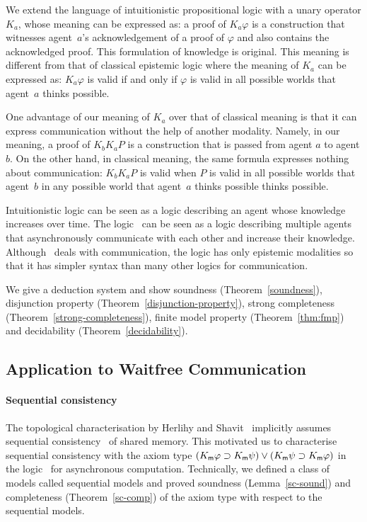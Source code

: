    We extend the language of intuitionistic propositional logic with a unary operator $K_a$,
    whose meaning can be expressed as:
    a proof of $K_a\varphi$ is a construction that witnesses agent~$a$'s
    acknowledgement of a proof of $\varphi$ and also contains the acknowledged
    proof.  This formulation of knowledge is original.
    This meaning is different from that of classical epistemic logic where
    the meaning of $K_a$ can be expressed as:
    $K_a\varphi$ is valid if and only if $\varphi$ is valid in all possible worlds
    that agent~$a$ thinks possible.

    One advantage of our meaning of $K_a$ over that of classical meaning is that
    it can express communication without the help of another modality.
    Namely, in our meaning,
    a proof of $K_bK_a P$ is a construction that is passed from agent $a$ to agent
    $b$.
    On the other hand, in classical meaning, the same formula expresses nothing about
    communication:
    $K_b K_a P$ is valid when $P$ is valid in all possible worlds that agent~$b$ in any
    possible world that agent~$a$ thinks possible thinks possible.

    Intuitionistic logic can be seen as a logic describing an agent whose knowledge increases over
    time.
    The logic \iec\,  can be seen as a logic describing multiple agents
    that asynchronously communicate with each other and increase their knowledge.
    Although \iec\, deals with communication, the logic has only epistemic modalities so that it
    has simpler syntax than many other logics for communication.

    We give a deduction system and show
    soundness (Theorem~\ref{soundness}), disjunction property (Theorem~\ref{disjunction-property}),
    strong completeness
    (Theorem~\ref{strong-completeness}), finite model property
    (Theorem~\ref{thm:fmp}) and decidability (Theorem~\ref{decidability}).

  \subsection{Application to Waitfree Communication}

    \paragraph{Sequential consistency}
    The topological characterisation by Herlihy and Shavit~\cite{herlihy1999topological}
    implicitly assumes sequential consistency~\cite{lamport1979make} of shared memory.
    This motivated us to characterise sequential consistency with the axiom type
    $(K_{\sf m} \varphi\supset K_{\sf m} \psi)\vee (K_{\sf m}
       \psi\supset K_{\sf m} \varphi)$
       in the logic \iec\, for asynchronous computation.
       Technically, we defined a class of models called sequential models
       and proved soundness
       (Lemma~\ref{sc-sound}) and completeness
       (Theorem~\ref{sc-comp}) of the axiom type with respect to the sequential models.

